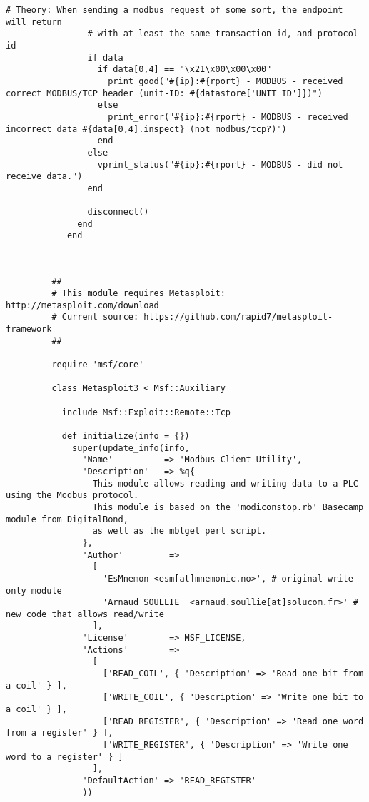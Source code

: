 \documentclass[article,msc=informatik,type=msc,colorback,accentcolor=tud9c]{tudthesis}
\begin{document}
\begin{appendix}
\begin{lstlisting}[caption=Metasploit Modbus Detect Script,label=lst:Metasploit Modbus Detect Script]
  	      	    # Theory: When sending a modbus request of some sort, the endpoint will return
  	      	    # with at least the same transaction-id, and protocol-id
  	      	    if data
  	      	      if data[0,4] == "\x21\x00\x00\x00"
  	      	        print_good("#{ip}:#{rport} - MODBUS - received correct MODBUS/TCP header (unit-ID: #{datastore['UNIT_ID']})")
  	      	      else
  	      	        print_error("#{ip}:#{rport} - MODBUS - received incorrect data #{data[0,4].inspect} (not modbus/tcp?)")
  	      	      end
  	      	    else
  	      	      vprint_status("#{ip}:#{rport} - MODBUS - did not receive data.")
  	      	    end
  	      	
  	      	    disconnect()
  	      	  end
  	      	end
  	      	
  	      	\end{lstlisting}
  	      	
  	     \newpage
  	     
  	     \begin{lstlisting}[caption=Metasploit script of Writing into Modbus Registers, label=lst:Modbusclinet]
  	     
  	     ##
  	     # This module requires Metasploit: http://metasploit.com/download
  	     # Current source: https://github.com/rapid7/metasploit-framework
  	     ##
  	     
  	     require 'msf/core'
  	     
  	     class Metasploit3 < Msf::Auxiliary
  	     
  	       include Msf::Exploit::Remote::Tcp
  	     
  	       def initialize(info = {})
  	         super(update_info(info,
  	           'Name'          => 'Modbus Client Utility',
  	           'Description'   => %q{
  	             This module allows reading and writing data to a PLC using the Modbus protocol.
  	             This module is based on the 'modiconstop.rb' Basecamp module from DigitalBond,
  	             as well as the mbtget perl script.
  	           },
  	           'Author'         =>
  	             [
  	               'EsMnemon <esm[at]mnemonic.no>', # original write-only module
  	               'Arnaud SOULLIE  <arnaud.soullie[at]solucom.fr>' # new code that allows read/write
  	             ],
  	           'License'        => MSF_LICENSE,
  	           'Actions'        =>
  	             [
  	               ['READ_COIL', { 'Description' => 'Read one bit from a coil' } ],
  	               ['WRITE_COIL', { 'Description' => 'Write one bit to a coil' } ],
  	               ['READ_REGISTER', { 'Description' => 'Read one word from a register' } ],
  	               ['WRITE_REGISTER', { 'Description' => 'Write one word to a register' } ]
  	             ],
  	           'DefaultAction' => 'READ_REGISTER'
  	           ))
  	     

\end{lstlisting}
\end{appendix}
\end{document}
